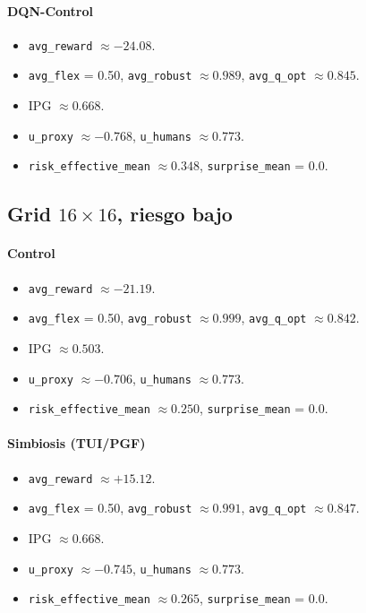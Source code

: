 \documentclass[11pt]{article}
\begin{document}
\paragraph{DQN-Control}
\begin{itemize}
  \item \texttt{avg\_reward} $\approx -24.08$.
  \item \texttt{avg\_flex} = 0.50, \texttt{avg\_robust} $\approx 0.989$, \texttt{avg\_q\_opt} $\approx 0.845$.
  \item IPG $\approx 0.668$.
  \item \texttt{u\_proxy} $\approx -0.768$, \texttt{u\_humans} $\approx 0.773$.
  \item \texttt{risk\_effective\_mean} $\approx 0.348$, \texttt{surprise\_mean} = 0.0.
\end{itemize}

\subsection{Grid $16\times 16$, riesgo bajo}

\paragraph{Control}
\begin{itemize}
  \item \texttt{avg\_reward} $\approx -21.19$.
  \item \texttt{avg\_flex} = 0.50, \texttt{avg\_robust} $\approx 0.999$, \texttt{avg\_q\_opt} $\approx 0.842$.
  \item IPG $\approx 0.503$.
  \item \texttt{u\_proxy} $\approx -0.706$, \texttt{u\_humans} $\approx 0.773$.
  \item \texttt{risk\_effective\_mean} $\approx 0.250$, \texttt{surprise\_mean} = 0.0.
\end{itemize}

\paragraph{Simbiosis (TUI/PGF)}
\begin{itemize}
  \item \texttt{avg\_reward} $\approx +15.12$.
  \item \texttt{avg\_flex} = 0.50, \texttt{avg\_robust} $\approx 0.991$, \texttt{avg\_q\_opt} $\approx 0.847$.
  \item IPG $\approx 0.668$.
  \item \texttt{u\_proxy} $\approx -0.745$, \texttt{u\_humans} $\approx 0.773$.
  \item \texttt{risk\_effective\_mean} $\approx 0.265$, \texttt{surprise\_mean} = 0.0.
\end{itemize}
\end{document}
